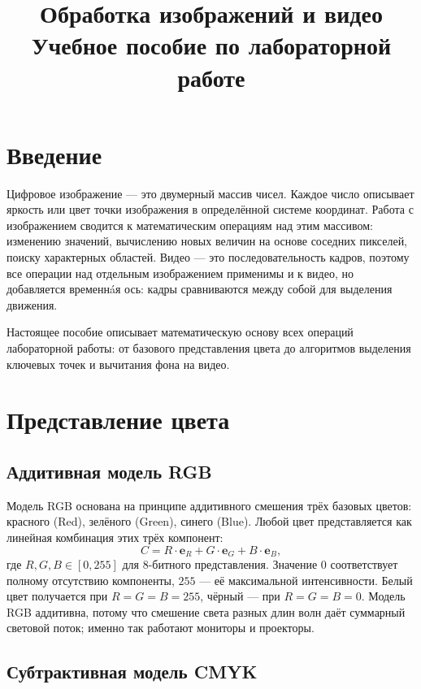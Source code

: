 \documentclass[a4paper,12pt]{article}
\title{Обработка изображений и видео\\\large Учебное пособие по лабораторной работе}
\author{}
\date{}
\begin{document}
\maketitle

\section*{Введение}

Цифровое изображение --- это двумерный массив чисел. Каждое число описывает яркость или цвет точки изображения в определённой системе координат. Работа с изображением сводится к математическим операциям над этим массивом: изменению значений, вычислению новых величин на основе соседних пикселей, поиску характерных областей. Видео --- это последовательность кадров, поэтому все операции над отдельным изображением применимы и к видео, но добавляется временнáя ось: кадры сравниваются между собой для выделения движения.

Настоящее пособие описывает математическую основу всех операций лабораторной работы: от базового представления цвета до алгоритмов выделения ключевых точек и вычитания фона на видео.

\section{Представление цвета}

\subsection{Аддитивная модель RGB}

Модель RGB основана на принципе аддитивного смешения трёх базовых цветов: красного (Red), зелёного (Green), синего (Blue). Любой цвет представляется как линейная комбинация этих трёх компонент:
\[
C = R \cdot \mathbf{e}_R + G \cdot \mathbf{e}_G + B \cdot \mathbf{e}_B,
\]
где $R, G, B \in [0, 255]$ для 8-битного представления. Значение $0$ соответствует полному отсутствию компоненты, $255$ --- её максимальной интенсивности. Белый цвет получается при $R = G = B = 255$, чёрный --- при $R = G = B = 0$. Модель RGB аддитивна, потому что смешение света разных длин волн даёт суммарный световой поток; именно так работают мониторы и проекторы.

\subsection{Субтрактивная модель CMYK}
\end{document}
